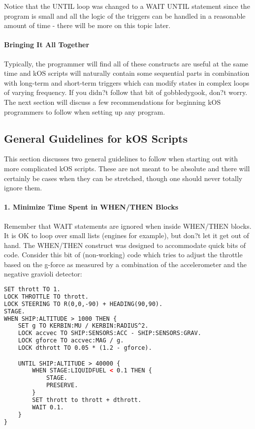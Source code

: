 Notice that the UNTIL loop was changed to a WAIT UNTIL statement since the program is small and all the logic of the triggers can be handled in a reasonable amount of time - there will be more on this topic later.

\paragraph{Bringing It All Together}
Typically, the programmer will find all of these constructs are useful at the same time and kOS scripts will naturally contain some sequential parts in combination with long-term and short-term triggers which can modify states in complex loops of varying frequency. If you didn?t follow that bit of gobbledygook, don?t worry. The next section will discuss a few recommendations for beginning kOS programmers to follow when setting up any program.

\subsection{General Guidelines for kOS Scripts}
This section discusses two general guidelines to follow when starting out with more complicated kOS scripts. These are not meant to be absolute and there will certainly be cases when they can be stretched, though one should never totally ignore them.

\paragraph{1. Minimize Time Spent in WHEN/THEN Blocks}
Remember that WAIT statements are ignored when inside WHEN/THEN blocks. It is OK to loop over small lists (engines for example), but don?t let it get out of hand. The WHEN/THEN construct was designed to accommodate quick bits of code. Consider this bit of (non-working) code which tries to adjust the throttle based on the g-force as measured by a combination of the accelerometer and the negative gravioli detector:

\begin{lstlisting}[frame=single,language=XML]
SET thrott TO 1.
LOCK THROTTLE TO thrott.
LOCK STEERING TO R(0,0,-90) + HEADING(90,90).
STAGE.
WHEN SHIP:ALTITUDE > 1000 THEN {
    SET g TO KERBIN:MU / KERBIN:RADIUS^2.
    LOCK accvec TO SHIP:SENSORS:ACC - SHIP:SENSORS:GRAV.
    LOCK gforce TO accvec:MAG / g.
    LOCK dthrott TO 0.05 * (1.2 - gforce).

    UNTIL SHIP:ALTITUDE > 40000 {
        WHEN STAGE:LIQUIDFUEL < 0.1 THEN {
            STAGE.
            PRESERVE.
        }
        SET thrott to thrott + dthrott.
        WAIT 0.1.
    }
}
\end{lstlisting} 

